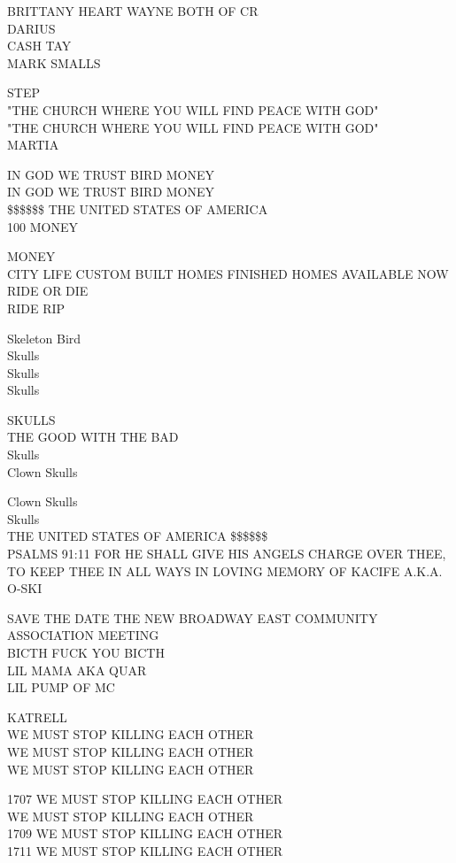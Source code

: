 \documentclass[10pt,letterpaper]{article}
\begin{document}
BRITTANY HEART WAYNE BOTH OF CR\\
DARIUS\\
CASH TAY\\
MARK SMALLS

STEP\\
"THE CHURCH WHERE YOU WILL FIND PEACE WITH GOD"\\
"THE CHURCH WHERE YOU WILL FIND PEACE WITH GOD"\\
MARTIA

IN GOD WE TRUST BIRD MONEY\\
IN GOD WE TRUST BIRD MONEY\\
\$\$\$\$\$\$ THE UNITED STATES OF AMERICA\\
100 MONEY

MONEY\\
CITY LIFE CUSTOM BUILT HOMES FINISHED HOMES AVAILABLE NOW\\
RIDE OR DIE\\
RIDE RIP

Skeleton Bird\\
Skulls\\
Skulls\\
Skulls

SKULLS\\
THE GOOD WITH THE BAD\\
Skulls\\
Clown Skulls

Clown Skulls\\
Skulls\\
THE UNITED STATES OF AMERICA \$\$\$\$\$\$\\
PSALMS 91:11 FOR HE SHALL GIVE HIS ANGELS CHARGE OVER THEE, TO KEEP THEE IN ALL WAYS IN LOVING MEMORY OF KACIFE A.K.A. O{-}SKI

SAVE THE DATE THE NEW BROADWAY EAST COMMUNITY ASSOCIATION MEETING\\
BICTH FUCK YOU BICTH\\
LIL MAMA AKA QUAR\\
LIL PUMP OF MC

KATRELL\\
WE MUST STOP KILLING EACH OTHER\\
WE MUST STOP KILLING EACH OTHER\\
WE MUST STOP KILLING EACH OTHER

1707 WE MUST STOP KILLING EACH OTHER\\
WE MUST STOP KILLING EACH OTHER\\
1709 WE MUST STOP KILLING EACH OTHER\\
1711 WE MUST STOP KILLING EACH OTHER
\end{document}
